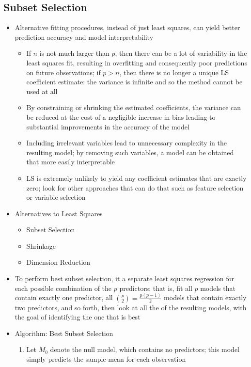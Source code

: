 \documentclass[12pt]{article}
\begin{document}
\subsection{Subset Selection}
\begin{itemize} 
\item Alternative fitting procedures, instead of just least squares, can yield better prediction accuracy and model interpretability \begin{itemize} 
\item If $n$ is not much larger than $p$, then there can be a lot of variability in the least squares fit, resulting in overfitting and consequently poor predictions on future observations; if $p > n$, then there is no longer a unique LS coefficient estimate: the variance is infinite and so the method cannot be used at all
\item By constraining or shrinking the estimated coefficients, the variance can be reduced at the cost of a negligible increase in bias leading to substantial improvements in the accuracy of the model 
\item Including irrelevant variables lead to unnecessary complexity in the resulting model; by removing such variables, a model can be obtained that more easily interpretable 
\item LS is extremely unlikely to yield any coefficient estimates that are exactly zero; look for other approaches that can do that such as feature selection or variable selection \end{itemize} 
\item Alternatives to Least Squares \begin{itemize} 
\item Subset Selection \item Shrinkage \item Dimension Reduction \end{itemize} 
\item To perform best subset selection, it a separate least squares regression for each possible combination of the $p$ predictors; that is, fit all $p$ models that contain exactly one predictor, all $\binom{p}{2} = \frac{p(p-1)}{2}$ models that contain exactly two predictors, and so forth, then look at all the of the resulting models, with the goal of identifying the one that is best 
\item Algorithm: Best Subset Selection \begin{enumerate} 
\item Let $M_0$ denote the null model, which contains no predictors; this model simply predicts the sample mean for each observation 

\end{enumerate}
\end{itemize}
\end{document}

